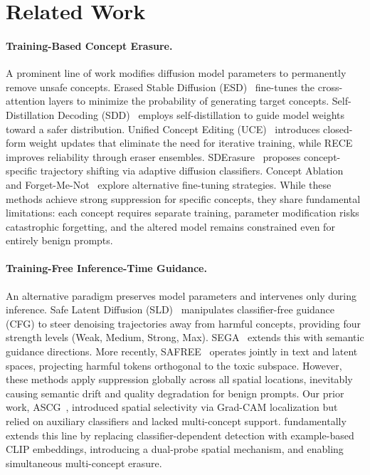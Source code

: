 \section{Related Work}

\paragraph{Training-Based Concept Erasure.}
A prominent line of work modifies diffusion model parameters to permanently remove unsafe concepts. Erased Stable Diffusion (ESD)~\citep{gandikota2023erasing} fine-tunes the cross-attention layers to minimize the probability of generating target concepts. Self-Distillation Decoding (SDD)~\citep{kim2023towards} employs self-distillation to guide model weights toward a safer distribution. Unified Concept Editing (UCE)~\citep{gandikota2024unified} introduces closed-form weight updates that eliminate the need for iterative training, while RECE~\citep{gong2024reliable} improves reliability through eraser ensembles. SDErasure~\citep{lu2026sderasure} proposes concept-specific trajectory shifting via adaptive diffusion classifiers. Concept Ablation~\citep{kumari2023ablating} and Forget-Me-Not~\citep{zhang2024forget} explore alternative fine-tuning strategies. While these methods achieve strong suppression for specific concepts, they share fundamental limitations: each concept requires separate training, parameter modification risks catastrophic forgetting, and the altered model remains constrained even for entirely benign prompts.

\paragraph{Training-Free Inference-Time Guidance.}
An alternative paradigm preserves model parameters and intervenes only during inference. Safe Latent Diffusion (SLD)~\citep{schramowski2023safe} manipulates classifier-free guidance (CFG) to steer denoising trajectories away from harmful concepts, providing four strength levels (Weak, Medium, Strong, Max). SEGA~\citep{brack2023sega} extends this with semantic guidance directions. More recently, SAFREE~\citep{yoon2024safree} operates jointly in text and latent spaces, projecting harmful tokens orthogonal to the toxic subspace. However, these methods apply suppression globally across all spatial locations, inevitably causing semantic drift and quality degradation for benign prompts. Our prior work, ASCG~\citep{gil2026ascg}, introduced spatial selectivity via Grad-CAM localization but relied on auxiliary classifiers and lacked multi-concept support. \ours{} fundamentally extends this line by replacing classifier-dependent detection with example-based CLIP embeddings, introducing a dual-probe spatial mechanism, and enabling simultaneous multi-concept erasure.

